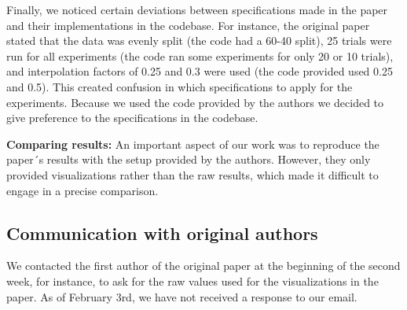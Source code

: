 Finally, we noticed certain deviations between specifications made in the paper and their implementations in the codebase. For instance, the original paper stated that the data was evenly split (the code had a 60-40 split), 25 trials were run for all experiments (the code ran some experiments for only 20 or 10 trials), and interpolation factors of 0.25 and 0.3 were used (the code provided used 0.25 and 0.5). This created confusion in which specifications to apply for the experiments. Because we used the code provided by the authors we decided to give preference to the specifications in the codebase. \newline

\textbf{Comparing results:} An important aspect of our work was to reproduce the paper´s results with the setup provided by the authors. However, they only provided visualizations rather than the raw results, which made it difficult to engage in a precise comparison. 


\subsection{Communication with original authors}
We contacted the first author of the original paper at the beginning of the second week, for instance, to ask for the raw values used for the visualizations in the paper. As of February 3rd, we have not received a response to our email. 


